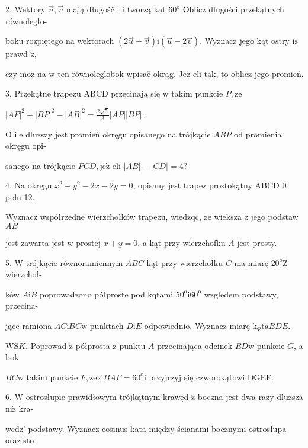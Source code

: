 \documentclass[a4paper,12pt]{article}
\begin{document}
2. Wektory $\vec{u}, \vec{v}$ mają długośč l $\mathrm{i}$ tworzą kąt $60^{\mathrm{o}}$ Oblicz dlugości przekątnych równoległo-

boku rozpiętego na wektorach $(2\vec{u}-\vec{v})\mathrm{i}(\vec{u}-2\vec{v})$. Wyznacz jego kąt ostry $\mathrm{i}\mathrm{s}$prawd $\acute{\mathrm{z}},$

czy $\mathrm{m}\mathrm{o}\dot{\mathrm{z}}$ na $\mathrm{w}$ ten równoleglobok wpisač okrąg. $\mathrm{J}\mathrm{e}\dot{\mathrm{z}}$ eli $\mathrm{t}\mathrm{a}\mathrm{k}$, to oblicz jego promień.

3. Przekątne trapezu ABCD przecinają się $\mathrm{w}$ takim punkcie $P, \dot{\mathrm{z}}\mathrm{e}$

$|AP|^{2}+|BP|^{2}-|AB|^{2}=\displaystyle \frac{2\sqrt{5}}{3}|AP||BP|.$

$\mathrm{O}$ ile dluzszy jest promień okręgu opisanego na trójkącie $ABP$ od promienia okręgu opi-

sanego na trójkącie $PCD, \mathrm{j}\mathrm{e}\dot{\mathrm{z}}$ eli $|AB|-|CD|=4$?

4. Na okręgu $x^{2}+y^{2}-2x-2y=0$, opisany jest trapez prostokątny ABCD $0$ polu 12.

Wyznacz współrzedne wierzchołków trapezu, wiedzqc, $\dot{\mathrm{z}}\mathrm{e}$ wieksza $\mathrm{z}$ jego podstaw $AB$

jest zawarta jest $\mathrm{w}$ prostej $x+y=0$, a kąt przy wierzchofku $A$ jest prosty.

5. $\mathrm{W}$ trójkącie równoramiennym $ABC$ kąt przy wierzchołku $C$ ma miarę $20^{\mathrm{o}} \mathrm{Z}$ wierzchoł-

ków $A\mathrm{i}B$ poprowadzono półproste pod kqtami $50^{\mathrm{o}}\mathrm{i}60^{\mathrm{o}}$ wzgledem podstawy, przecina-

jące ramiona $AC\mathrm{i}BC\mathrm{w}$ punktach $D\mathrm{i}E$ odpowiednio. Wyznacz miarę $\mathrm{k}_{\Phi}\mathrm{t}\mathrm{a}BDE.$

$\mathrm{W}\mathrm{S}K.$ Poprowad $\acute{\mathrm{z}}$ półprosta $\mathrm{z}$ punktu $A$ przecinająca odcinek $BD\mathrm{w}$ punkcie $G$, a bok

$BC\mathrm{w}$ takim punkcie $F, \dot{\mathrm{z}}\mathrm{e}\angle BAF=60^{\mathrm{o}}\mathrm{i}$ przyjrzyj się czworokątowi DGEF.

6. $\mathrm{W}$ ostrosłupie prawidłowym trójkątnym krawęd $\acute{\mathrm{z}}$ boczna jest dwa razy dluzsza $\mathrm{n}\mathrm{i}\dot{\mathrm{z}}$ kra-

wedz' podstawy. Wyznacz cosinus kata między ścianami bocznymi ostrosłupa oraz sto-
\end{document}
